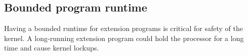 \subsection{Bounded program runtime}
%
%
%

Having a bounded runtime for extension programs is critical for safety of the
    kernel.
A long-running extension program could hold the processor for a long time and
    cause kernel lockups.


